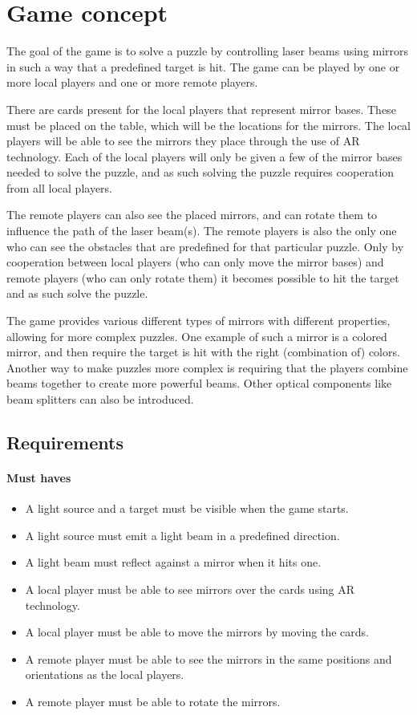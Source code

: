 \section{Game concept}

The goal of the game is to solve a puzzle by controlling laser beams using mirrors
in such a way that a predefined target is hit. The game can be played by 
one or more local players and one or more remote players.

There are cards present for the local players that represent mirror bases. These 
must be placed on the table, which will be the locations for the mirrors. The local
players will be able to see the mirrors they place through the use of AR technology.
Each of the local players will only be given a few of the mirror bases needed to solve
the puzzle, and as such solving the puzzle requires cooperation from all local players.

The remote players can also see the placed mirrors, and can rotate them to influence 
the path of the laser beam(s). The remote players is also the only one who can see the
obstacles that are predefined for that particular puzzle. Only by cooperation between 
local players (who can only move the mirror bases) and remote players (who can only 
rotate them) it becomes possible to hit the target and as such solve the puzzle.

The game provides various different types of mirrors with different properties, 
allowing for more complex puzzles. One example of such a mirror is a colored mirror, 
and then require the target is hit with the right (combination of) colors. Another 
way to make puzzles more complex is requiring that the players combine beams together
to create more powerful beams. Other optical components like beam splitters can
also be introduced.

\subsection{Requirements}

\paragraph{Must haves}
\begin{itemize}
	\item A light source and a target must be visible when the game starts.
	\item A light source must emit a light beam in a predefined direction.
	\item A light beam must reflect against a mirror when it hits one.
	\item A local player must be able to see mirrors over the cards using AR technology.
	\item A local player must be able to move the mirrors by moving the cards.
	\item A remote player must be able to see the mirrors in the same positions and 
		  orientations as the local players.
	\item A remote player must be able to rotate the mirrors.
\end{itemize}

